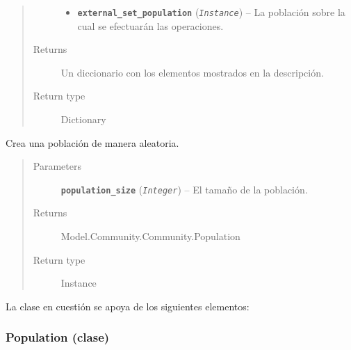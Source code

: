 \documentclass[letterpaper,10pt,english]{sphinxmanual}
\begin{document}
\begin{fulllineitems}
\begin{fulllineitems}
\begin{quote}
\begin{description}
\begin{itemize}
\item {} 
\textbf{\texttt{external\_set\_population}} (\emph{\texttt{Instance}}) -- La población sobre la cual se efectuarán las operaciones.

\end{itemize}

\item[{Returns}] \leavevmode
Un diccionario con los elementos mostrados en la descripción.

\item[{Return type}] \leavevmode
Dictionary

\end{description}\end{quote}

\end{fulllineitems}


\begin{fulllineitems}
\label{Model/Community/Community:Model.Community.Community.Community.init_population}
Crea una población de manera aleatoria.
\begin{quote}\begin{description}
\item[{Parameters}] \leavevmode
\textbf{\texttt{population\_size}} (\emph{\texttt{Integer}}) -- El tamaño de la población.

\item[{Returns}] \leavevmode
Model.Community.Community.Population

\item[{Return type}] \leavevmode
Instance

\end{description}\end{quote}

\end{fulllineitems}


\end{fulllineitems}


La clase en cuestión se apoya de los siguientes elementos:


\subsubsection{Population (clase)}
\label{Model/Community/Population/Population:population-clase}\label{Model/Community/Population/Population:module-Model.Community.Population.Population}\label{Model/Community/Population/Population::doc}
\end{document}
